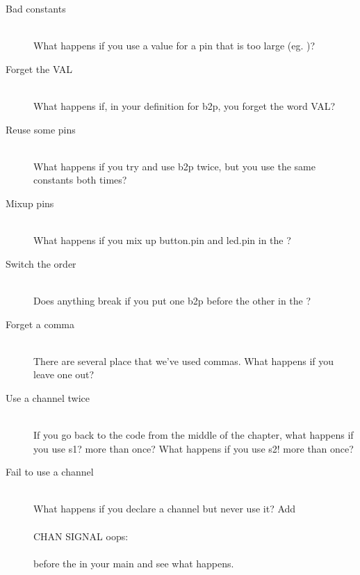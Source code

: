 \begin{description}
	\item[Bad constants]\ \\
	What happens if you use a value for a pin that is too large (eg. {})?
	\item[Forget the {\keyword VAL}]\ \\
	What happens if, in your definition for {\code b2p}, you forget the word {\keyword VAL}?
	\item[Reuse some pins]\ \\
	What happens if you try and use {\code b2p} twice, but you use the same constants both times?
	\item[Mixup pins]\ \\
	What happens if you mix up {\code button.pin} and {\code led.pin} in the ?
	\item[Switch the order]\ \\
	Does anything break if you put one {\code b2p} before the other in the \PAR?
	\item[Forget a comma]\ \\
	There are several place that we've used commas. What happens if you leave one out?
	\item[Use a channel twice]\ \\
	If you go back to the code from the middle of the chapter, what happens if you use {\code s1?} more than once? What happens if you use {\code s2!} more than once?
	\item[Fail to use a channel]\ \\
	What happens if you declare a channel but never use it? Add \\
	\ \\
	{\code CHAN SIGNAL oops:} \\
	\ \\
	before the \PAR in your {\code main} and see what happens.
\end{description}
